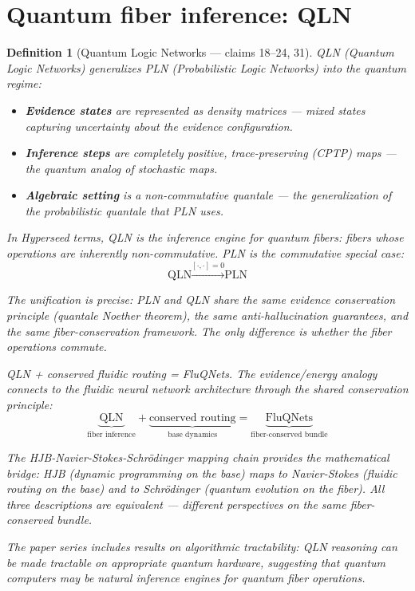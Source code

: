 \documentclass[11pt,a4paper]{article}
\newtheorem{definition}{Definition}[section]
\begin{document}

\section{Quantum fiber inference: QLN}
\label{sec:qln}

\begin{definition}[Quantum Logic Networks --- claims 18--24, 31]
\label{def:qln}
QLN (Quantum Logic Networks) generalizes PLN (Probabilistic Logic
Networks) into the quantum regime:
\begin{itemize}
\item \textbf{Evidence states} are represented as density matrices ---
  mixed states capturing uncertainty about the evidence configuration.
\item \textbf{Inference steps} are completely positive, trace-preserving
  (CPTP) maps --- the quantum analog of stochastic maps.
\item \textbf{Algebraic setting} is a non-commutative quantale --- the
  generalization of the probabilistic quantale that PLN uses.
\end{itemize}

In Hyperseed terms, QLN is the inference engine for \emph{quantum fibers}:
fibers whose operations are inherently non-commutative. PLN is the
commutative special case:
\[
  \text{QLN} \xrightarrow{[\cdot, \cdot] = 0} \text{PLN}
\]

The unification is precise: PLN and QLN share the same evidence
conservation principle (quantale Noether theorem), the same
anti-hallucination guarantees, and the same fiber-conservation
framework. The only difference is whether the fiber operations commute.

QLN + conserved fluidic routing = FluQNets. The evidence/energy analogy
connects to the fluidic neural network architecture through the shared
conservation principle:
\[
  \underbrace{\text{QLN}}_{\text{fiber inference}} +
  \underbrace{\text{conserved routing}}_{\text{base dynamics}} =
  \underbrace{\text{FluQNets}}_{\text{fiber-conserved bundle}}
\]

The HJB-Navier-Stokes-Schr\"odinger mapping chain provides the
mathematical bridge: HJB (dynamic programming on the base) maps to
Navier-Stokes (fluidic routing on the base) and to Schr\"odinger
(quantum evolution on the fiber). All three descriptions are equivalent
--- different perspectives on the same fiber-conserved bundle.

The paper series includes results on algorithmic tractability: QLN
reasoning can be made tractable on appropriate quantum hardware,
suggesting that quantum computers may be natural inference engines
for quantum fiber operations.
\end{definition}
\end{document}
